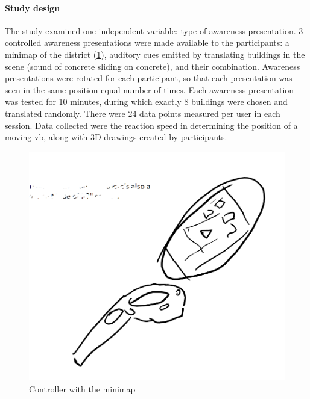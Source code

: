 \paragraph{Study design}
The study examined one independent variable: type of awareness presentation. 3 controlled awareness presentations  were made available to the participants: a minimap of the district (\ref{fig:minimap_controller}), auditory cues emitted by translating buildings in the scene (sound of concrete sliding on concrete), and their combination. Awareness presentations were rotated for each participant, so that each presentation was seen in the same position equal number of times. 
Each awareness presentation was tested for 10 minutes, during which exactly 8 buildings were chosen and translated randomly. There were 24 data points measured per user in each session. Data collected were the reaction speed in determining the position of a moving \gls{vb}, along with 3D drawings created by participants.

\begin{figure}[h]
	\centering
	\includegraphics[width=0.7\linewidth]{figures/placeholders/minimap_controller}
	\caption{Controller with the minimap}
	\label{fig:minimap_controller}
\end{figure}


